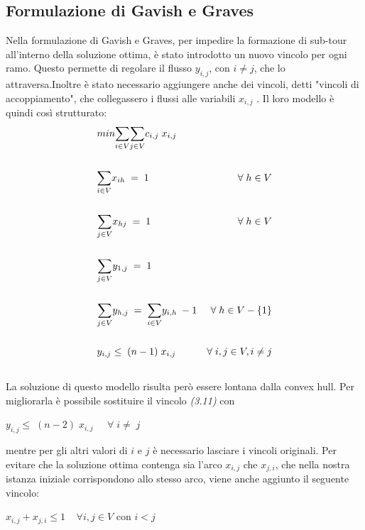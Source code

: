 \subsection{Formulazione di Gavish e Graves}
Nella formulazione di Gavish e Graves, per impedire la formazione di sub-tour all'interno della soluzione ottima, è stato introdotto un nuovo vincolo per ogni ramo. Questo permette di regolare il flusso $y_{i,j}$, con $i\neq j$,  che lo attraversa.Inoltre è stato necessario aggiungere anche dei vincoli, detti "vincoli di accoppiamento", che collegassero i flussi alle variabili $x_{i,j}$ . Il loro modello è quindi così strutturato:
\begin{align}
& min\underset{i\in V}\sum{\underset{j\in V}\sum{c_{i,j}\; x_{i,j}}} \\ \notag \\
& \underset{i\in V}\sum{x_{ih}}\;=\;1 & \forall\;h\in V \\ \notag\\
& \underset{j\in V}\sum{x_{hj}}\;=\;1 & \forall\;h\in V \\ \notag\\
& \underset{j\in V}\sum{y_{1,j}}\;=\;1\\ \notag\\
& \underset{j\in V}\sum{y_{h,j}}\;=\;\underset{i\in V}\sum{y_{i,h}}\;-1 & \forall\;h\in V-\{1\}\\ \notag\\
& y_{i,j}\leq\;(n-1)\;x_{i,j} & \forall\;i,j\in V, i\neq j\\ \notag
\end{align}
La soluzione di questo modello risulta però essere lontana dalla convex hull. Per migliorarla è possibile sostituire il vincolo \textit{(3.11)} con \\
\begin{center}
$y_{i,j}\leq\;(n-2)\;x_{i,j} \;\;\;\;\;\forall\; i\neq \; j$\\
\end{center}
mentre per gli altri valori di $i$ e $j$ è necessario lasciare i vincoli originali. 
Per evitare che la soluzione ottima contenga sia l'arco $x_{i,j}$ che $x_{j,i}$, che nella nostra istanza iniziale corrispondono allo stesso arco, viene anche aggiunto il seguente vincolo:
\begin{center}
$x_{i,j}+x_{j,i}\leq 1\;\;\;\; \forall i,j \in V$ con $i < j$
\end{center}


